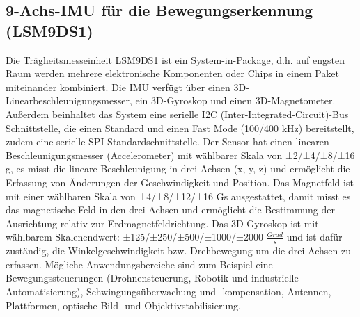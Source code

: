 \subsection{9-Achs-IMU für die Bewegungserkennung (LSM9DS1)}
	Die Trägheitsmesseinheit LSM9DS1 ist ein System-in-Package, d.h. auf engsten Raum werden mehrere elektronische Komponenten oder Chips in einem Paket miteinander kombiniert.\cite{Wagner.2013} Die IMU verfügt über einen 3D-Linearbeschleunigungsmesser, ein 3D-Gyroskop und einen 3D-Magnetometer. Außerdem beinhaltet das System eine serielle I2C (Inter-Integrated-Circuit)-Bus Schnittstelle, die einen Standard und einen Fast Mode (100/400 kHz) bereitstellt, zudem eine serielle SPI-Standardschnittstelle. Der Sensor hat einen linearen Beschleunigungsmesser (Accelerometer) mit wählbarer Skala von ±2/±4/±8/±16 g, es misst die lineare Beschleunigung in drei Achsen (x, y, z) und ermöglicht die Erfassung von Änderungen der Geschwindigkeit und Position. Das Magnetfeld ist mit einer wählbaren Skala von ±4/±8/±12/±16 Gs ausgestattet, damit misst es das magnetische Feld in den drei Achsen und ermöglicht die Bestimmung der Ausrichtung relativ zur Erdmagnetfeldrichtung. Das 3D-Gyroskop ist mit wählbarem Skalenendwert: ±125/±250/±500/±1000/±2000 $\frac{Grad}{s}$ und ist dafür zuständig, die Winkelgeschwindigkeit bzw. Drehbewegung um die drei Achsen zu erfassen.\cite{STM1.2015}\cite{Ard.2024}
Mögliche Anwendungsbereiche sind zum Beispiel eine Bewegungssteuerungen (Drohnensteuerung, Robotik und industrielle Automatisierung), Schwingungsüberwachung und -kompensation, Antennen, Plattformen, optische Bild- und Objektivstabilisierung.  


